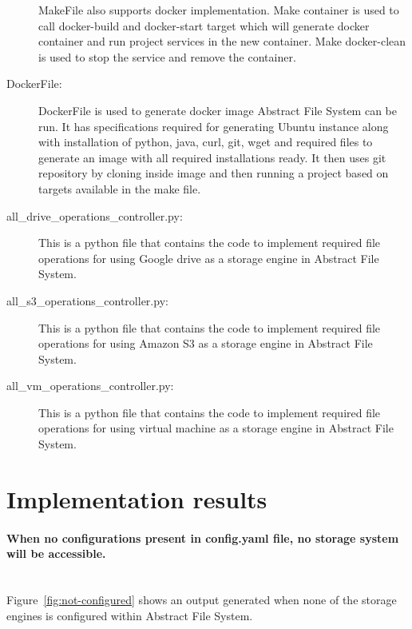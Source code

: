 \begin{description}
MakeFile also supports docker implementation. Make container is used to call 
docker-build and docker-start target which will generate docker container and 
run project services in the new container. Make docker-clean is used to stop 
the service and remove the container. 

\item[DockerFile:]


DockerFile is used to generate docker image Abstract File System can be run. 
It has specifications required for generating Ubuntu instance along with 
installation of python, java, curl, git, wget and required files to generate 
an image with all required installations ready. It then uses git repository by 
cloning inside image and then running a project based on targets available in 
the make file. 

\item[all\_drive\_operations\_controller.py:]


This is a python file that contains the code to implement required file 
operations for using Google drive as a storage engine in Abstract File System.

\item[all\_s3\_operations\_controller.py:]


This is a python file that contains the code to implement required file 
operations for using Amazon S3 as a storage engine in Abstract File System. 

\item[all\_vm\_operations\_controller.py:]

This is a python file that contains the code to implement required file 
operations for using virtual machine as a storage engine in Abstract File 
System. 

\end{description}



\section{Implementation results}

\paragraph{When no configurations present in config.yaml file, no storage 
system will be accessible.}
\\

Figure~\ref{fig:not-configured} shows an output generated when none of 
the storage engines is configured within Abstract File System. 


